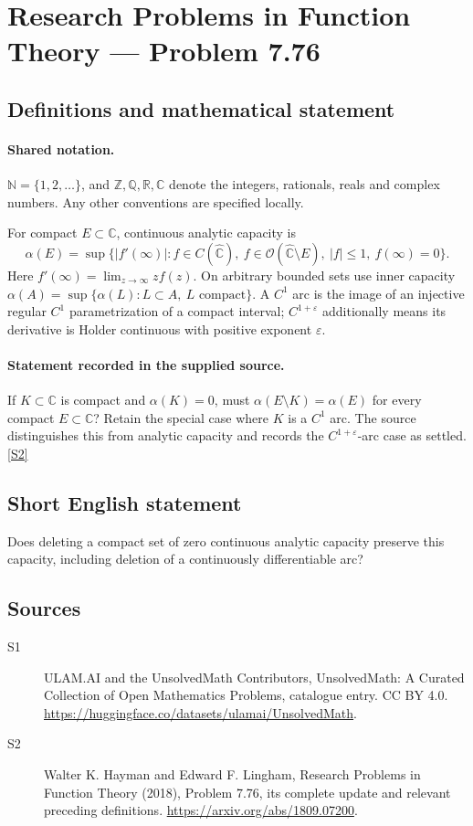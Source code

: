 \documentclass[11pt]{article}
\newcommand{\sref}[2]{\hyperlink{source:#1:#2}{[S#2]}}
\begin{document}
\section{Research Problems in Function Theory — Problem 7.76}\label{statement}

\subsection{Definitions and mathematical statement}

\paragraph{Shared notation.}$\mathbb N=\{1,2,\ldots\}$, and $\mathbb Z,\mathbb Q,\mathbb R,\mathbb C$ denote the integers, rationals, reals and complex numbers. Any other conventions are specified locally.


For compact $E\subset\mathbb C$, continuous analytic capacity is
\[\alpha(E)=\sup\{|f'(\infty)|:f\in C(\widehat{\mathbb C}),\ f\in\mathcal O(\widehat{\mathbb C}\setminus E),\ |f|\le1,\ f(\infty)=0\}.
\]
Here $f'(\infty)=\lim_{z\to\infty}zf(z)$. On arbitrary bounded sets use inner capacity $\alpha(A)=\sup\{\alpha(L):L\subset A,\ L\text{ compact}\}$. A $C^1$ arc is the image of an injective regular $C^1$ parametrization of a compact interval; $C^{1+\varepsilon}$ additionally means its derivative is Holder continuous with positive exponent $\varepsilon$.
\paragraph{Statement recorded in the supplied source.}
If $K\subset\mathbb C$ is compact and $\alpha(K)=0$, must $\alpha(E\setminus K)=\alpha(E)$ for every compact $E\subset\mathbb C$? Retain the special case where $K$ is a $C^1$ arc. The source distinguishes this from analytic capacity and records the $C^{1+\varepsilon}$-arc case as settled. \sref{statement}{2}
\subsection{Short English statement}
Does deleting a compact set of zero continuous analytic capacity preserve this capacity, including deletion of a continuously differentiable arc?
\subsection{Sources}
\begin{description}
\item[\hypertarget{source:statement:1}{S1}] ULAM.AI and the UnsolvedMath Contributors, UnsolvedMath: A Curated Collection of Open Mathematics Problems, catalogue entry. CC BY 4.0. \url{https://huggingface.co/datasets/ulamai/UnsolvedMath}.
\item[\hypertarget{source:statement:2}{S2}] Walter K. Hayman and Edward F. Lingham, Research Problems in Function Theory (2018), Problem 7.76, its complete update and relevant preceding definitions. \url{https://arxiv.org/abs/1809.07200}.
\end{description}
\label{end:statement}
\end{document}
